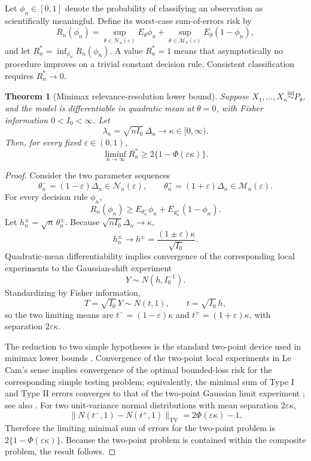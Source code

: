 \documentclass[11pt]{article}
\newtheorem{theorem}{Theorem}
\theoremstyle{remark}
\begin{document}
Let $\phi_n\in[0,1]$ denote the probability of classifying an observation as scientifically meaningful. Define its worst-case sum-of-errors risk by
\[
R_n(\phi_n)
=
\sup_{\theta\in\mathcal N_n(\varepsilon)}E_\theta\phi_n
+
\sup_{\theta\in\mathcal M_n(\varepsilon)}E_\theta(1-\phi_n),
\]
and let $R_n^*=\inf_{\phi_n}R_n(\phi_n)$. A value $R_n^*=1$ means that asymptotically no procedure improves on a trivial constant decision rule. Consistent classification requires $R_n^*\to0$.

\begin{theorem}[Minimax relevance-resolution lower bound]
\label{thm:minimax}
Suppose $X_1,\ldots,X_n\stackrel{\mathrm{iid}}{\sim}P_\theta$, and the model is differentiable in quadratic mean at $\theta=0$, with Fisher information $0<I_0<\infty$. Let
\[
\lambda_n=\sqrt{nI_0}\,\Delta_n\longrightarrow\kappa\in[0,\infty).
\]
Then, for every fixed $\varepsilon\in(0,1)$,
\[
\liminf_{n\to\infty}R_n^*
\ge
2\{1-\Phi(\varepsilon\kappa)\}.
\]
\end{theorem}

\begin{proof}
Consider the two parameter sequences
\[
\theta_n^-=(1-\varepsilon)\Delta_n\in\mathcal N_n(\varepsilon),
\qquad
\theta_n^+=(1+\varepsilon)\Delta_n\in\mathcal M_n(\varepsilon).
\]
For every decision rule $\phi_n$,
\[
R_n(\phi_n)
\ge
E_{\theta_n^-}\phi_n+E_{\theta_n^+}(1-\phi_n).
\]
Let $h_n^\pm=\sqrt n\,\theta_n^\pm$. Because $\sqrt{nI_0}\Delta_n\to\kappa$,
\[
h_n^\pm\longrightarrow h^\pm
=
\frac{(1\pm\varepsilon)\kappa}{\sqrt{I_0}}.
\]
Quadratic-mean differentiability implies convergence of the corresponding local experiments to the Gaussian-shift experiment
\[
Y\sim N(h,I_0^{-1}).
\]
Standardizing by Fisher information,
\[
T=\sqrt{I_0}\,Y\sim N(t,1),
\qquad t=\sqrt{I_0}\,h,
\]
so the two limiting means are $t^-=(1-\varepsilon)\kappa$ and $t^+=(1+\varepsilon)\kappa$, with separation $2\varepsilon\kappa$.

The reduction to two simple hypotheses is the standard two-point device used in minimax lower bounds \citep[Chapter~2]{tsybakov2009}. Convergence of the two-point local experiments in Le Cam's sense implies convergence of the optimal bounded-loss risk for the corresponding simple testing problem; equivalently, the minimal sum of Type I and Type II errors converges to that of the two-point Gaussian limit experiment \citep[Chapter~9]{vandervaart1998}; see also \citet{lecam2000}. For two unit-variance normal distributions with mean separation $2\varepsilon\kappa$,
\[
\|N(t^-,1)-N(t^+,1)\|_{\mathrm{TV}}
=
2\Phi(\varepsilon\kappa)-1.
\]
Therefore the limiting minimal sum of errors for the two-point problem is $2\{1-\Phi(\varepsilon\kappa)\}$. Because the two-point problem is contained within the composite problem, the result follows.
\end{proof}
\end{document}
